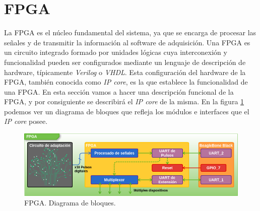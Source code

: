 \section{FPGA}
	La FPGA es el núcleo fundamental del sistema, ya que se encarga de procesar las señales y de transmitir la información al software de
	adquisición. Una FPGA es un circuito integrado formado por unidades lógicas cuya interconexión y funcionalidad pueden ser configurados
	mediante un lenguaje de descripción de hardware, típicamente \emph{Verilog} o \emph{VHDL}. Esta configuración del hardware de la FPGA, también
	conocida como \emph{IP core}, es la que establece la funcionalidad de una FPGA. En esta sección vamos a hacer una descripción funcional de la
	FPGA, y por consiguiente se describirá el \emph{IP core} de la misma. En la figura \ref{fig:fpga} podemos ver un diagrama de bloques que
	refleja los módulos e interfaces que el \emph{IP core} posee.
	\begin{figure}[h]
		\centering
		\includegraphics[keepaspectratio, width=1\textwidth]{./img/fpga.png}
		\caption{FPGA. Diagrama de bloques.}
		\label{fig:fpga}
	\end{figure}	
